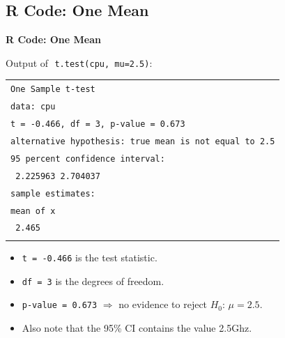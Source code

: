 \documentclass[compress]{beamer}        %
\makeatletter
\newcommand{\tcb}{\textcolor{beamer@blendedblue}}
\makeatother
\begin{document}
\subsection{R Code: One Mean}
\begin{frame}{\bf \tcb{R Code: One Mean}}

Output of\,\, \texttt{t.test(cpu, mu=2.5)}:\\[0.3cm]

\begin{footnotesize}
\begin{tabular}{|l|}
\hline
\texttt{One Sample t-test}\\[0.2cm]
\texttt{data:  cpu}\\
\texttt{t = -0.466, df = 3, p-value = 0.673}\\
\texttt{alternative hypothesis: true mean is not equal to 2.5}\\
\texttt{95 percent confidence interval:}\\
\texttt{ 2.225963 2.704037}\\
\texttt{sample estimates:}\\
\texttt{mean of x}\\
\texttt{    2.465 }\\
\hline
\multicolumn{1}{c}{}\\[0.0cm]
\end{tabular}
\end{footnotesize}
\begin{itemize}\itemsep0.2cm
\item \texttt{t = -0.466} is the test statistic.
\item \texttt{df = 3} is the degrees of freedom.
\item \texttt{p-value = 0.673} $\Rightarrow$ no evidence to reject $H_0: \, \mu = 2.5$.
\item Also note that the 95\% CI contains the value 2.5Ghz.
\end{itemize}


\end{frame}
\end{document}
